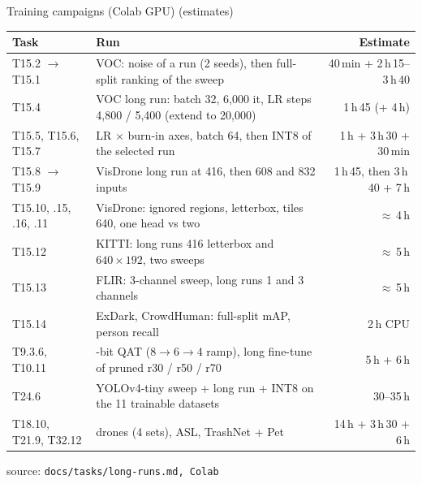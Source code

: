 \documentclass[aspectratio=169,11pt]{beamer}
\newcommand\src[1]{\par\vfill{\tiny\color{gray}source: \texttt{#1}}}
\newcommand\plan{\textcolor{orange!80!black}{\small(estimates)}}
\begin{document}
\begin{frame}{Training campaigns (Colab GPU) \plan}
  \scriptsize
  \begin{tabularx}{\linewidth}{@{}l>{\raggedright\arraybackslash}Xr@{}}
    \toprule
    Task & Run & Estimate \\
    \midrule
    T15.2 $\to$ T15.1 & VOC: noise of a run (2 seeds), then full-split ranking of the sweep & 40\,min + 2\,h\,15--3\,h\,40 \\
    T15.4 & VOC long run: batch 32, 6,000 it, LR steps 4,800 / 5,400 (extend to 20,000) & 1\,h\,45 (+ 4\,h) \\
    T15.5, T15.6, T15.7 & LR $\times$ burn-in axes, batch 64, then INT8 of the selected run & 1\,h + 3\,h\,30 + 30\,min \\
    T15.8 $\to$ T15.9 & VisDrone long run at 416, then 608 and 832 inputs & 1\,h\,45, then 3\,h\,40 + 7\,h \\
    T15.10, .15, .16, .11 & VisDrone: ignored regions, letterbox, tiles 640, one head vs two & $\approx$\,4\,h \\
    T15.12 & KITTI: long runs 416 letterbox and $640\times192$, two sweeps & $\approx$\,5\,h \\
    T15.13 & FLIR: 3-channel sweep, long runs 1 and 3 channels & $\approx$\,5\,h \\
    T15.14 & ExDark, CrowdHuman: full-split mAP, person recall & 2\,h CPU \\
    T9.3.6, T10.11 & 4-bit QAT (8$\to$6$\to$4 ramp), long fine-tune of pruned r30 / r50 / r70 & 5\,h + 6\,h \\
    T24.6 & YOLOv4-tiny sweep + long run + INT8 on the 11 trainable datasets & 30--35\,h \\
    T18.10, T21.9, T32.12 & drones (4 sets), ASL, TrashNet + Pet & 14\,h + 3\,h\,30 + 6\,h \\
    \bottomrule
  \end{tabularx}
  \src{docs/tasks/long-runs.md, Colab}
\end{frame}
\end{document}
